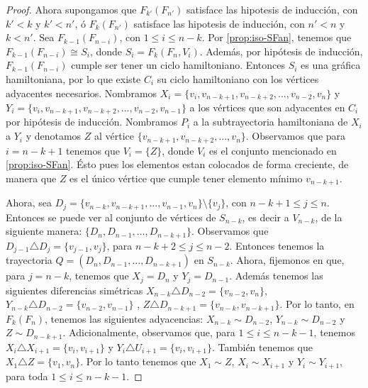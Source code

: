 \begin{proof}
            Ahora supongamos que $F_{k'}(F_{n'})$ satisface las hipotesis de
            inducci\'on, con $k'< k$ y $k'<n'$, \'o $F_k(F_{n'})$ satisface las
            hipotesis de inducci\'on, con $n'<n$ y $k < n'$. Sea $F_{k-1}(F_{n-i})$,
            con $1 \leq i \leq n-k$. Por \cref{prop:iso-SFan}, tenemos que
            $F_{k-1}(F_{n-i}) \cong S_i$, donde $S_i= F_k(F_n, V_i)$. Adem\'as, por
            hip\'otesis de inducci\'on, $F_{k-1}(F_{n-i})$ cumple ser tener un ciclo
            hamiltoniano. Entonces $S_i$ es una gr\'afica hamiltoniana, por lo que
            existe $C_i$ su ciclo hamiltoniano con los v\'ertices adyacentes
            necesarios. Nombramos $X_i = \{v_i, v_{n-k+1}, v_{n-k+2}, \dots,
            v_{n-2}, v_n\}$ y $Y_i= \{v_i, v_{n-k+1}, v_{n-k+2}, \dots, v_{n-2},
            v_{n-1}\}$ a los v\'ertices que son adyacentes en $C_i$ por hip\'otesis
            de inducci\'on. Nombramos $P_i$ a la subtrayectoria hamiltoniana de
            $X_i$ a $Y_i$ y denotamos $Z$ al v\'ertice $\{v_{n-k+1}, v_{n-k+2},
            \dots, v_n\}$. Observamos que para $i= n-k+1$ tenemos que $V_i = \{Z\}$,
            donde $V_i$ es el conjunto mencionado en \cref{prop:iso-SFan}. \'Esto
            pues los elementos estan colocados de forma creciente, de manera que $Z$
            es el \'unico v\'ertice que cumple tener elemento m\'inimo $v_{n-k+1}$. 
    
            Ahora, sea $D_j =\{v_{n-k}, v_{n-k+1}, \dots, v_{n-1}, v_n\} \setminus
            \{v_j\}$, con $n-k+1 \leq j \leq n$.  Entonces se puede ver al conjunto
            de v\'ertices de $S_{n-k}$, es decir a $V_{n-k}$, de la siguiente
            manera: $\{D_n, D_{n-1}, \dots, D_{n-k+1}\}$. Observamos que $D_{j-1}
            \triangle D_j= \{v_{j-1}, v_j\}$, para $n-k+2 \leq j \leq n-2$. Entonces
            tenemos la trayectoria $Q= (D_n, D_{n-1}, \dots, D_{n-k+1})$ en $S_{n-k}$.     
            Ahora, fijemonos en que, para $j= n-k$, tenemos que $X_j = D_n$ y $Y_j=
            D_{n-1}$. Adem\'as tenemos las siguientes diferencias sim\'etricas
            $X_{n-k}\triangle D_{n-2} =\{v_{n-2}, v_n\}$, $Y_{n-k}\triangle D_{n-2}
            =\{v_{n-2}, v_{n-1}\}$ , $Z\triangle D_{n-k+1} =\{v_{n-k}, v_{n-k+1}\}$.
            Por lo tanto, en $F_k(F_n)$, tenemos las siguientes adyacencias:
            $X_{n-k} \sim D_{n-2}$, $Y_{n-k} \sim D_{n-2}$ y $Z \sim D_{n-k+1}$.
            Adicionalmente, observamos que, para $1 \leq i \leq n- k- 1$, tenemos
            $X_{i} \triangle X_{i+1}= \{v_i, v_{i+1}\}$ y $Y_i \triangle U_{i+1} =
            \{v_i, v_{i+1}\}$. Tambi\'en tenemos que $X_1 \triangle Z = \{v_1,
            v_n\}$. Por lo tanto tenemos que $X_1 \sim Z$, $X_i \sim X_{i+1}$ y $Y_i
            \sim Y_{i+1}$, para toda $1 \leq i \leq n-k-1$.
            

\end{proof}
